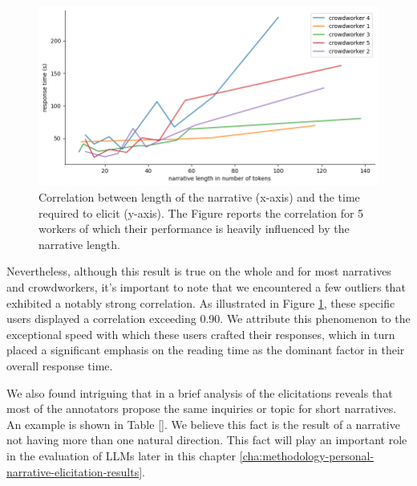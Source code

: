 \begin{figure}[!htbp]
        \includegraphics[width=1\linewidth]{assets//imgs/dataset-high-correlation-workers.png}
        \caption{Correlation between length of the narrative (x-axis) and the time required to elicit (y-axis). The Figure reports the correlation for 5 workers of which their performance is heavily influenced by the narrative length.}
        \label{fig:dataset-high-correlation-workers}
\end{figure}
Nevertheless, although this result is true on the whole and for most narratives and crowdworkers, it's important to note that we encountered a few outliers that exhibited a notably strong correlation. As illustrated in Figure \ref{fig:dataset-high-correlation-workers}, these specific users displayed a correlation exceeding 0.90. We attribute this phenomenon to the exceptional speed with which these users crafted their responses, which in turn placed a significant emphasis on the reading time as the dominant factor in their overall response time.

We also found intriguing that in a brief analysis of the elicitations reveals that most of the annotators propose the same inquiries or topic for short narratives. An example is shown in Table \ref{}. We believe this fact is the result of a narrative not having more than one natural direction. This fact will play an important role in the evaluation of LLMs later in this chapter \ref{cha:methodology-personal-narrative-elicitation-results}.
